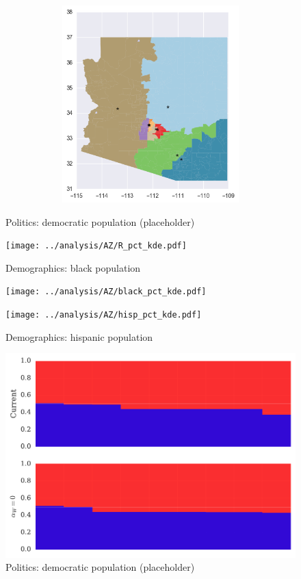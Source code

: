 \begin{figure}[htb!]
\includegraphics[width=5in,height=3in,keepaspectratio]{../maps/AZ/static/0_25_after.png}
\end{figure}

\clearpage
\newpage

\begin{figure}[htb!] \centering
\caption{ Politics: democratic population (placeholder)}
\texttt{[image: ../analysis/AZ/R\_pct\_kde.pdf]}
\caption{ Demographics: black population }
\texttt{[image: ../analysis/AZ/black\_pct\_kde.pdf]}
\caption{ Demographics: hispanic population }
\texttt{[image: ../analysis/AZ/hisp\_pct\_kde.pdf]}
\end{figure}

\clearpage
\newpage

\begin{figure}[htb!] \centering
\caption{ Politics: democratic population (placeholder)}
\includegraphics[width=6in]{../analysis/AZ/barplot.pdf}
\end{figure}

